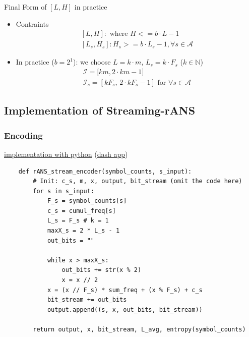 \begin{frame}[fragile]{Final Form of $[L,H]$ in practice}
    \begin{itemize}
        \item Contraints $$\begin{gathered}\mathit{[L,H]}: \text{ where } \mathit{H <= b\cdot L -1} \\ \mathit{[L_s, H_s]: H_s >= b \cdot L_s - 1}, \forall \mathit{s} \in \mathcal{A}\end{gathered}$$
        \item In practice ($\mathit{b}=2^1$): we choose $\mathit{L=k\cdot m}$, $\mathit{L_s=k\cdot F_s}$ ($\mathit{k} \in \mathbb{N}$) $$\begin{gathered}\mathcal{I}=\mathit{[km}, 2\cdot \mathit{km}-1] \\ \mathcal{I}_{\mathit{s}} =[\mathit{kF_s}, \,2\cdot \mathit{kF_s} -1] \text{   for   } \forall \mathit{s} \in \mathcal{A} \end{gathered}$$
    \end{itemize}
\end{frame}

\subsection{Implementation of Streaming-rANS}
\subsubsection{Encoding}
\begin{frame}[fragile]
    \href{http://localhost:8050}{implementation with python} (\href{https://github.com/hurryclear/cs_theory/tree/data_compression/24ws_data_compression/implementation}{dash app})
    \begin{verbatim}
    def rANS_stream_encoder(symbol_counts, s_input):
        # Init: c_s, m, x, output, bit_stream (omit the code here)
        for s in s_input:
            F_s = symbol_counts[s]
            c_s = cumul_freq[s]
            L_s = F_s # k = 1
            maxX_s = 2 * L_s - 1
            out_bits = ""

            while x > maxX_s:
                out_bits += str(x % 2)
                x = x // 2
            x = (x // F_s) * sum_freq + (x % F_s) + c_s
            bit_stream += out_bits
            output.append((s, x, out_bits, bit_stream))
        
        return output, x, bit_stream, L_avg, entropy(symbol_counts)
    \end{verbatim}
\end{frame}
